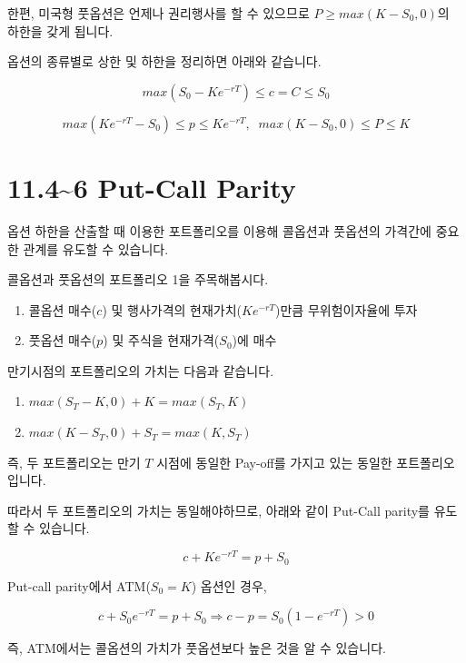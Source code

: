 \documentclass[
  letterpaper,
  DIV=11,
  numbers=noendperiod]{scrreprt}
\providecommand{\tightlist}{%
  \setlength{\itemsep}{0pt}\setlength{\parskip}{0pt}}\usepackage{longtable,booktabs,array}
\begin{document}
한편, 미국형 풋옵션은 언제나 권리행사를 할 수 있으므로
\(P\geq max(K-S_0,0)\)의 하한을 갖게 됩니다.

옵션의 종류별로 상한 및 하한을 정리하면 아래와 같습니다.

\[max(S_0-Ke^{-rT})\leq c=C\leq S_0\]

\[max(Ke^{-rT}-S_0)\leq p\leq Ke^{-rT},\;\;max(K-S_0,0)\leq P \leq K\]

\section*{11.4\textasciitilde6 Put-Call Parity}\label{put-call-parity}


옵션 하한을 산출할 때 이용한 포트폴리오를 이용해 콜옵션과 풋옵션의
가격간에 중요한 관계를 유도할 수 있습니다.

콜옵션과 풋옵션의 포트폴리오 1을 주목해봅시다.

\begin{enumerate}
\def\labelenumi{\arabic{enumi}.}
\tightlist
\item
  콜옵션 매수(\(c\)) 및 행사가격의 현재가치(\(Ke^{-rT}\))만큼
  무위험이자율에 투자
\item
  풋옵션 매수(\(p\)) 및 주식을 현재가격(\(S_0\))에 매수
\end{enumerate}

만기시점의 포트폴리오의 가치는 다음과 같습니다.

\begin{enumerate}
\def\labelenumi{\arabic{enumi}.}
\tightlist
\item
  \(max(S_T-K,0)+K=max(S_T,K)\)
\item
  \(max(K-S_T,0)+S_T=max(K,S_T)\)
\end{enumerate}

즉, 두 포트폴리오는 만기 \(T\) 시점에 동일한 Pay-off를 가지고 있는
동일한 포트폴리오입니다.

따라서 두 포트폴리오의 가치는 동일해야하므로, 아래와 같이 Put-Call
parity를 유도할 수 있습니다.

\[c+Ke^{-rT}=p+S_0\]

\begin{tcolorbox}[enhanced jigsaw, titlerule=0mm, bottomtitle=1mm, left=2mm, title=\textcolor{quarto-callout-tip-color}{\faLightbulb}\hspace{0.5em}{ATM 옵션의 가격}, toptitle=1mm, bottomrule=.15mm, colframe=quarto-callout-tip-color-frame, breakable, opacityback=0, rightrule=.15mm, opacitybacktitle=0.6, coltitle=black, colback=white, arc=.35mm, colbacktitle=quarto-callout-tip-color!10!white, toprule=.15mm, leftrule=.75mm]

Put-call parity에서 ATM(\(S_0=K\)) 옵션인 경우,

\[c+S_0e^{-rT}=p+S_0\Rightarrow c-p=S_0(1-e^{-rT})>0\]

즉, ATM에서는 콜옵션의 가치가 풋옵션보다 높은 것을 알 수 있습니다.

\end{tcolorbox}
\end{document}
